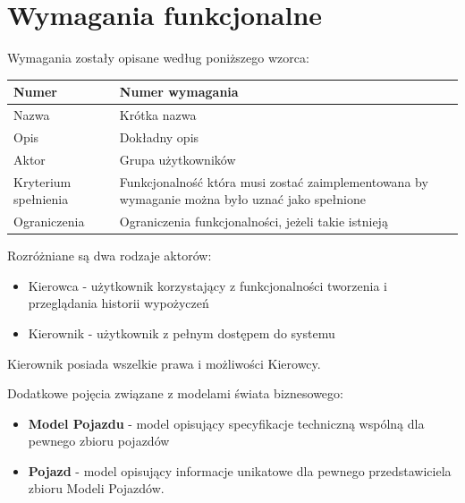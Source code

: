 \documentclass[eng,printmode,openany]{mgr}
\begin{document}
	\section{Wymagania funkcjonalne}
	Wymagania zostały opisane według poniższego wzorca:
	\begin{table}[H]
		\begin{tabularx}{\textwidth}{|l|X|}
			\hline
			Numer                & Numer wymagania \\ \hline
			Nazwa                & Krótka nazwa\\ \hline
			Opis                 & Dokładny opis\\ \hline
			Aktor                & Grupa użytkowników\\ \hline
			Kryterium spełnienia & Funkcjonalność która musi zostać zaimplementowana by wymaganie można było uznać jako spełnione\\ \hline
			Ograniczenia         & Ograniczenia funkcjonalności, jeżeli takie istnieją\\ \hline
		\end{tabularx}
	\end{table}
	Rozróżniane są dwa rodzaje aktorów:
	\begin{itemize}
		\item Kierowca - użytkownik korzystający z funkcjonalności tworzenia i przeglądania historii wypożyczeń
		\item Kierownik - użytkownik z pełnym dostępem do systemu
	\end{itemize}
	Kierownik posiada wszelkie prawa i możliwości Kierowcy.
	
	Dodatkowe pojęcia związane z modelami świata biznesowego:
	\begin{itemize}
		\item \textbf{Model Pojazdu} - model opisujący specyfikacje techniczną wspólną dla pewnego zbioru pojazdów
		\item \textbf{Pojazd} - model opisujący informacje unikatowe dla pewnego przedstawiciela zbioru Modeli Pojazdów.
	\end{itemize}
	
\end{document}
